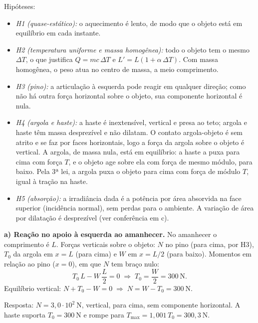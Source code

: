 \documentclass{article}%
\begin{document}
Hipóteses:
\begin{itemize}
\item \textit{H1 (quase-estático):} o aquecimento é lento, de modo que o objeto está em equilíbrio em cada instante.
\item \textit{H2 (temperatura uniforme e massa homogênea):} todo o objeto tem o mesmo $\Delta T$, o que justifica $Q = m c\,\Delta T$ e $L' = L(1+\alpha\,\Delta T)$. Com massa homogênea, o peso atua no centro de massa, a meio comprimento.
\item \textit{H3 (pino):} a articulação à esquerda pode reagir em qualquer direção; como não há outra força horizontal sobre o objeto, sua componente horizontal é nula.
\item \textit{H4 (argola e haste):} a haste é inextensível, vertical e presa ao teto; argola e haste têm massa desprezível e não dilatam. O contato argola-objeto é sem atrito e se faz por faces horizontais, logo a força da argola sobre o objeto é vertical. A argola, de massa nula, está em equilíbrio: a haste a puxa para cima com força $T$, e o objeto age sobre ela com força de mesmo módulo, para baixo. Pela 3ª lei, a argola puxa o objeto para cima com força de módulo $T$, igual à tração na haste.
\item \textit{H5 (absorção):} a irradiância dada é a potência por área absorvida na face superior (incidência normal), sem perdas para o ambiente. A variação de área por dilatação é desprezível (ver conferência em c).
\end{itemize}

\textbf{a) Reação no apoio à esquerda ao amanhecer.}
No amanhecer o comprimento é $L$. Forças verticais sobre o objeto: $N$ no pino (para cima, por H3), $T_0$ da argola em $x = L$ (para cima) e $W$ em $x = L/2$ (para baixo). Momentos em relação ao pino ($x = 0$), em que $N$ tem braço nulo:
\[
T_0\,L - W\,\frac{L}{2} = 0 \;\Rightarrow\; T_0 = \frac{W}{2} = 300\ \mathrm{N}.
\]
Equilíbrio vertical: $N + T_0 - W = 0 \;\Rightarrow\; N = W - T_0 = 300\ \mathrm{N}$.

Resposta: $N = 3{,}0\cdot 10^{2}\ \mathrm{N}$, vertical, para cima, sem componente horizontal. A haste suporta $T_0 = 300\ \mathrm{N}$ e rompe para $T_{\max} = 1{,}001\,T_0 = 300{,}3\ \mathrm{N}$.
\end{document}
